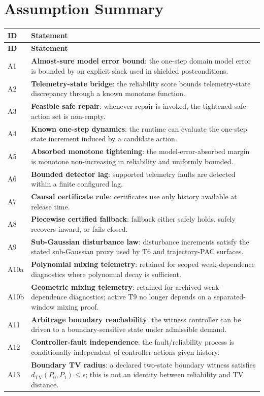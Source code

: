 \section{Assumption Summary}\label{app:assumptions}

\begin{longtable}{lp{10cm}}
\toprule
\textbf{ID} & \textbf{Statement} \\
\midrule
\endfirsthead
\toprule
\textbf{ID} & \textbf{Statement} \\
\midrule
\endhead
A1 & \textbf{Almost-sure model error bound}: the one-step domain model error is bounded by an explicit slack used in shielded postconditions. \\
A2 & \textbf{Telemetry-state bridge}: the reliability score bounds telemetry-state discrepancy through a known monotone function. \\
A3 & \textbf{Feasible safe repair}: whenever repair is invoked, the tightened safe-action set is non-empty. \\
A4 & \textbf{Known one-step dynamics}: the runtime can evaluate the one-step state increment induced by a candidate action. \\
A5 & \textbf{Absorbed monotone tightening}: the model-error-absorbed margin is monotone non-increasing in reliability and uniformly bounded. \\
A6 & \textbf{Bounded detector lag}: supported telemetry faults are detected within a finite configured lag. \\
A7 & \textbf{Causal certificate rule}: certificates use only history available at release time. \\
A8 & \textbf{Piecewise certified fallback}: fallback either safely holds, safely recovers inward, or fails closed. \\
A9 & \textbf{Sub-Gaussian disturbance law}: disturbance increments satisfy the stated sub-Gaussian proxy used by T6 and trajectory-PAC surfaces. \\
A10a & \textbf{Polynomial mixing telemetry}: retained for scoped weak-dependence diagnostics where polynomial decay is sufficient. \\
A10b & \textbf{Geometric mixing telemetry}: retained for archived weak-dependence diagnostics; active T9 no longer depends on a separated-window mixing proof. \\
A11 & \textbf{Arbitrage boundary reachability}: the witness controller can be driven to a boundary-sensitive state under admissible demand. \\
A12 & \textbf{Controller-fault independence}: the fault/reliability process is conditionally independent of controller actions given history. \\
A13 & \textbf{Boundary TV radius}: a declared two-state boundary witness satisfies $d_{\mathrm{TV}}(P_0,P_1)\le\epsilon$; this is not an identity between reliability and TV distance. \\
\bottomrule
\end{longtable}

